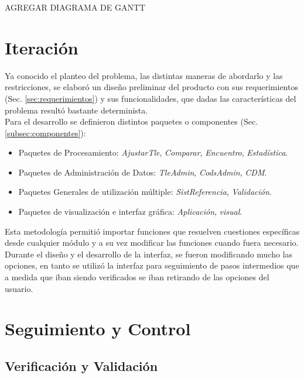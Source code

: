 AGREGAR DIAGRAMA DE GANTT \\

\section{Iteraci\'on}
Ya conocido el planteo del problema, las distintas maneras de abordarlo y las restricciones, se elabor\'o un diseño preliminar del producto con sus requerimientos (Sec. \ref{sec:requerimientos}) y sus funcionalidades, que dadas las caracter\'isticas del problema result\'o bastante determinista.\\

Para el desarrollo se definieron distintos paquetes o componentes (Sec. \ref{subsec:componentes}):\\

\begin{itemize}
\itemsep0em
 \item Paquetes de Procesamiento: {\it{AjustarTle}}, {\it{Comparar}}, {\it{Encuentro}}, {\it{Estad\'istica}}.
 \item Paquetes de Administraci\'on de Datos: {\it{TleAdmin}}, {\it{CodsAdmin}}, {\it{CDM}}.
 \item Paquetes Generales de utilizaci\'on m\'ultiple: {\it{SistReferencia}}, {\it{Validaci\'on}}.
 \item Paquetes de visualizaci\'on e interfaz gr\'afica: {\it{Aplicaci\'on}}, {\it{visual}}.
\end{itemize}

Esta metodolog\'ia permiti\'o importar funciones que resuelven cuestiones espec\'ificas desde cualquier  m\'odulo y a su vez modificar las funciones cuando fuera necesario.\\

Durante el diseño y el desarrollo de la interfaz, se fueron modificando mucho las opciones, en tanto se utiliz\'o la interfaz para seguimiento de pasos intermedios que a medida que iban siendo verificados se iban retirando de las opciones del usuario.\\

\section{Seguimiento y Control}

\subsection{Verificaci\'on y Validaci\'on}


